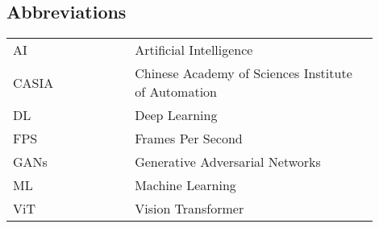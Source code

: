 \begin{center}
    \section*{Abbreviations}
    \begin{table}[h]
        \centering
        \renewcommand{\arraystretch}{1.5}
        \begin{tabular}{@{}p{0.3\linewidth}p{0.6\linewidth}@{}}
            AI    & Artificial Intelligence                             \\
            CASIA & Chinese Academy of Sciences Institute of Automation \\
            DL    & Deep Learning                                       \\
            FPS   & Frames Per Second                                   \\
            GANs  & Generative Adversarial Networks                     \\
            ML    & Machine Learning                                    \\
            ViT   & Vision Transformer                                  \\
        \end{tabular}
    \end{table}
\end{center}
